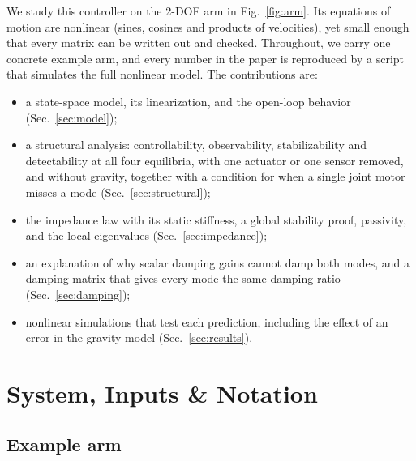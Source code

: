 \documentclass[letterpaper, 10pt, conference]{ieeeconf}
\begin{document}
We study this controller on the 2-DOF arm in
Fig.~\ref{fig:arm}. Its equations of motion are nonlinear
(sines, cosines and products of velocities), yet small
enough that every matrix can be written out and checked.
Throughout, we carry one concrete example arm, and every
number in the paper is reproduced by a script that
simulates the full nonlinear model. The contributions are:
\begin{itemize}
\item a state-space model, its linearization, and the
open-loop behavior (Sec.~\ref{sec:model});
\item a structural analysis: controllability, observability,
stabilizability and detectability at all four equilibria,
with one actuator or one sensor removed, and without
gravity, together with a condition for when a single joint
motor misses a mode (Sec.~\ref{sec:structural});
\item the impedance law with its static stiffness, a global
stability proof, passivity, and the local eigenvalues
(Sec.~\ref{sec:impedance});
\item an explanation of why scalar damping gains cannot damp
both modes, and a damping matrix that gives every mode the
same damping ratio (Sec.~\ref{sec:damping});
\item nonlinear simulations that test each prediction,
including the effect of an error in the gravity model
(Sec.~\ref{sec:results}).
\end{itemize}

\section{System, Inputs \& Notation}

\subsection{Example arm}
\end{document}
